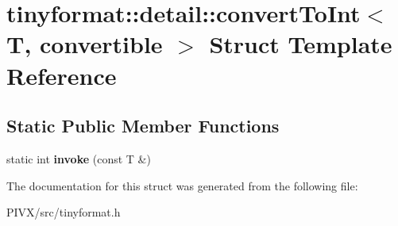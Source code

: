 \hypertarget{structtinyformat_1_1detail_1_1convert_to_int}{}\section{tinyformat\+:\+:detail\+:\+:convert\+To\+Int$<$ T, convertible $>$ Struct Template Reference}
\label{structtinyformat_1_1detail_1_1convert_to_int}
\subsection*{Static Public Member Functions}
\begin{DoxyCompactItemize}
\item 
\mbox{\label{structtinyformat_1_1detail_1_1convert_to_int_a1e1c0d85c6afc3bb21d2bc9458b3feb1}} 
static int {\bfseries invoke} (const T \&)
\end{DoxyCompactItemize}


The documentation for this struct was generated from the following file\+:\begin{DoxyCompactItemize}
\item 
P\+I\+V\+X/src/tinyformat.\+h\end{DoxyCompactItemize}

